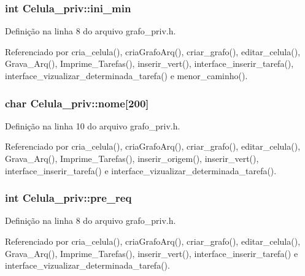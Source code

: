 \subsubsection[{ini\+\_\+min}]{\setlength{\rightskip}{0pt plus 5cm}int Celula\+\_\+priv\+::ini\+\_\+min}\label{structCelula__priv_a3c49601fe078bd7bb1512f0107af5301}


Definição na linha 8 do arquivo grafo\+\_\+priv.\+h.



Referenciado por cria\+\_\+celula(), cria\+Grafo\+Arq(), criar\+\_\+grafo(), editar\+\_\+celula(), Grava\+\_\+\+Arq(), Imprime\+\_\+\+Tarefas(), inserir\+\_\+vert(), interface\+\_\+inserir\+\_\+tarefa(), interface\+\_\+vizualizar\+\_\+determinada\+\_\+tarefa() e menor\+\_\+caminho().

\hypertarget{structCelula__priv_a7f33fa72aceed7b44922f0f39d6f7f59}{}
\subsubsection[{nome}]{\setlength{\rightskip}{0pt plus 5cm}char Celula\+\_\+priv\+::nome\mbox{[}200\mbox{]}}\label{structCelula__priv_a7f33fa72aceed7b44922f0f39d6f7f59}


Definição na linha 10 do arquivo grafo\+\_\+priv.\+h.



Referenciado por cria\+\_\+celula(), cria\+Grafo\+Arq(), criar\+\_\+grafo(), editar\+\_\+celula(), Grava\+\_\+\+Arq(), Imprime\+\_\+\+Tarefas(), inserir\+\_\+origem(), inserir\+\_\+vert(), interface\+\_\+inserir\+\_\+tarefa() e interface\+\_\+vizualizar\+\_\+determinada\+\_\+tarefa().

\hypertarget{structCelula__priv_a3ff8d3c4d0ba994771391320203619fc}{}
\subsubsection[{pre\+\_\+req}]{\setlength{\rightskip}{0pt plus 5cm}int Celula\+\_\+priv\+::pre\+\_\+req}\label{structCelula__priv_a3ff8d3c4d0ba994771391320203619fc}


Definição na linha 8 do arquivo grafo\+\_\+priv.\+h.



Referenciado por cria\+\_\+celula(), cria\+Grafo\+Arq(), criar\+\_\+grafo(), editar\+\_\+celula(), Grava\+\_\+\+Arq(), Imprime\+\_\+\+Tarefas(), inserir\+\_\+vert(), interface\+\_\+inserir\+\_\+tarefa() e interface\+\_\+vizualizar\+\_\+determinada\+\_\+tarefa().

